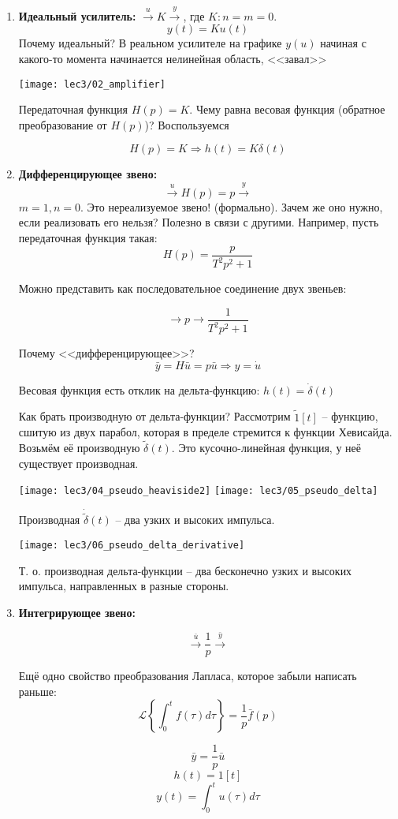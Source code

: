 \documentclass[main.tex]{subfiles}
\begin{document}
\begin{enumerate}[noitemsep]
	\item \textbf{Идеальный усилитель:} $ \xrightarrow{u} \boxed{K} \xrightarrow{y} $, где $ K: n=m=0 $.
    \[ y(t) = K u(t) \]
	Почему идеальный? В реальном усилителе на графике $ y(u) $ начиная с какого-то момента начинается нелинейная область, <<завал>>

    \texttt{[image: lec3/02\_amplifier]}

    Передаточная функция $ H(p) = K $.
    Чему равна весовая функция (обратное преобразование от $ H(p) $)?
    Воспользуемся

	\[ H(p) = K \Rightarrow h(t) = K \delta(t) \]

	\item \textbf{Дифференцирующее звено:}
    \[ \xrightarrow{u} \boxed{H(p)=p} \xrightarrow{y} \]
    $ m=1, n=0 $. Это нереализуемое звено! (формально).
	Зачем же оно нужно, если реализовать его нельзя?
	Полезно в связи с другими.
    Например, пусть передаточная функция такая:
    \[ H(p) = \frac{p}{T^2 p^2 + 1} \]

    Можно представить как последовательное соединение двух звеньев:

    \[ \to \boxed{p} \to \boxed{\frac{1}{T^2 p^2 + 1}} \]

    Почему <<дифференцирующее>>?
    \[ \bar y = H \bar u = p \bar u \Rightarrow y = \dot u \]

    Весовая функция есть отклик на дельта-функцию: $ h(t) = \dot \delta(t) $

    Как брать производную от дельта-функции?
    Рассмотрим $ \tilde 1[t] $ -- функцию, сшитую из двух парабол, которая в пределе стремится к функции Хевисайда.
    Возьмём её производную $ \tilde \delta(t) $.
    Это кусочно-линейная функция, у неё существует производная.

    \texttt{[image: lec3/04\_pseudo\_heaviside2]}
    \texttt{[image: lec3/05\_pseudo\_delta]}

    Производная $ \dot{ \tilde \delta }(t) $ -- два узких и высоких импульса.

    \texttt{[image: lec3/06\_pseudo\_delta\_derivative]}


	Т. о. производная дельта-функции -- два бесконечно узких и высоких импульса, направленных в разные стороны.

	\item \textbf{Интегрирующее звено:}

    \[ \xrightarrow{\bar u} \boxed{\frac{1}{p}}\xrightarrow{\bar y} \]

    \begin{leftbar}
        Ещё одно свойство преобразования Лапласа, которое забыли написать раньше:
        \[ \mathcal{L}\left\{ \int_{0}^{t} f(\tau) d\tau \right\} = \frac{1}{p} \bar f(p) \]
    \end{leftbar}
    \[ \bar y = \frac{1}{p} \bar u \]
    \[ h(t) = 1[t] \]
    \[ y(t) = \int_{0}^{t} u(\tau) d \tau \]
\end{enumerate}
\end{document}
